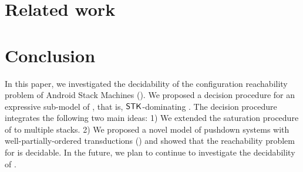 \documentclass[preprint,12pt]{elsarticle}
\begin{document}
\section{Related work}
%



\section{Conclusion}
% 
In this paper, we investigated the decidability of the configuration reachability problem of Android Stack Machines (\AMASS). We proposed a decision procedure for an expressive sub-model of {\AMASS}, that is, $\mathsf{STK}$-dominating {\AMASS}. The decision procedure integrates the following two main ideas: 1) We extended the saturation procedure of {\PDS} to multiple stacks. 2) We proposed a novel model of pushdown systems with well-partially-ordered transductions (\WOTrPDS) and showed that the reachability problem for {\WOTrPDS} is decidable.
In the future, we plan to continue to investigate the decidability of {\AMASS}. 

%
 




%

%
%
%
%
%
%
\newpage
% 
\end{document}
